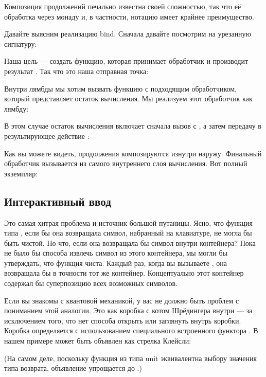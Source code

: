 Композиция продолжений печально известна своей сложностью, так что её
обработка через монаду и, в частности, нотацию 
имеет крайнее преимущество.

Давайте выясним реализацию bind. Сначала давайте посмотрим на
урезанную сигнатуру:

Наша цель --- создать функцию, которая принимает обработчик
 и производит результат . Так что
это наша отправная точка:

Внутри лямбды мы хотим вызвать функцию  с подходящим
обработчиком, который представляет остаток вычисления. Мы
реализуем этот обработчик как лямбду:

В этом случае остаток вычисления включает сначала вызов
 с , а затем передачу  в
результирующее действие :

Как вы можете видеть, продолжения композируются изнутри наружу. Финальный обработчик
 вызывается из самого внутреннего слоя вычисления.
Вот полный экземпляр:


\subsection{Интерактивный ввод}

Это самая хитрая проблема и источник большой путаницы.
Ясно, что функция типа , если бы она возвращала
символ, набранный на клавиатуре, не могла бы быть чистой. Но что, если она
возвращала бы символ внутри контейнера? Пока не было бы способа
извлечь символ из этого контейнера, мы могли бы утверждать, что
функция чиста. Каждый раз, когда вы вызываете , она возвращала бы
в точности тот же контейнер. Концептуально этот контейнер содержал бы
суперпозицию всех возможных символов.

Если вы знакомы с квантовой механикой, у вас не должно быть проблем
с пониманием этой аналогии. Это как коробка с
котом Шрёдингера внутри --- за исключением того, что нет способа открыть или заглянуть
внутрь коробки. Коробка определяется с использованием специального встроенного
функтора . В нашем примере  может быть объявлен
как стрелка Клейсли:

(На самом деле, поскольку функция из типа unit эквивалентна выбору
значения типа возврата, объявление 
упрощается до .)

